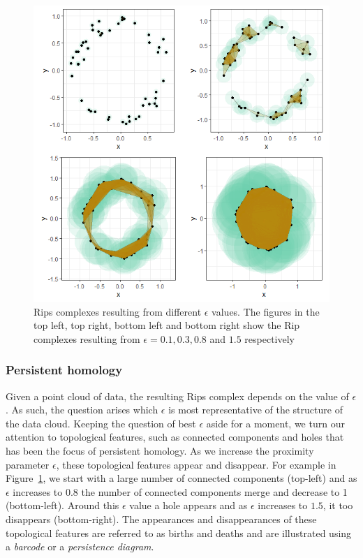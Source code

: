 \documentclass[letter,12pt]{article}
\begin{document}
\begin{figure}[!ht]
    \centering
    \includegraphics[scale=0.8]{four_plots_diff_radi.png}
    \caption{Rips complexes resulting from different $\epsilon$ values. The figures in the top left, top right, bottom left and bottom right show the Rip complexes resulting from $\epsilon = 0.1, 0.3, 0.8$ and $1.5$ respectively}
    \label{fig:annulus}
\end{figure}

\subsubsection{Persistent homology}\label{subsec:persistenthomology}
Given a point cloud of data, the resulting Rips complex depends on the value of $\epsilon$. As such, the question arises which $\epsilon$ is most representative of the structure of the data cloud. Keeping the question of best $\epsilon$ aside for a moment, we turn our attention to topological features, such as connected components and holes that has been the focus of persistent homology. As we increase the proximity parameter $\epsilon$, these topological features appear and disappear.  For example in Figure~\ref{fig:annulus}, we start with a large number of connected components (top-left) and as $\epsilon$ increases to $0.8$ the number of connected components merge and decrease to 1 (bottom-left). Around this $\epsilon$ value a hole appears and as $\epsilon$ increases to $1.5$, it too disappears (bottom-right). The appearances and disappearances of these topological features are referred to as births and deaths  and are illustrated using a \textit{barcode} or a \textit{persistence diagram}. 
\end{document}
